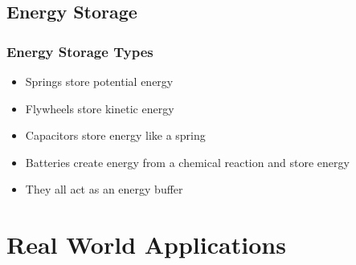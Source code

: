 \documentclass[]{beamer}
\begin{document}
\subsection{Energy Storage}
\frame
{
    \frametitle{Energy Storage Types}
    \begin{itemize}[<+->]
        \item Springs store potential energy 
        \item Flywheels store kinetic energy 
        \item Capacitors store energy like a spring 
        \item Batteries create energy from a chemical reaction and store energy
        \item They all act as an energy buffer
    \end{itemize}
}
\section{Real World Applications}
\end{document}

